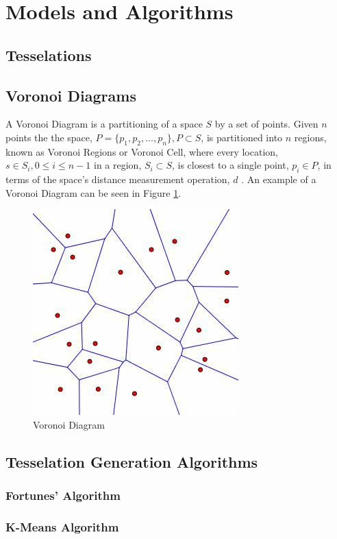\section{Models and Algorithms}\label{tes}
\subsection{Tesselations}\label{tes:sec:tess}
\subsection{Voronoi Diagrams}\label{tes:sec:vor}
A Voronoi Diagram is a partitioning of a space $S$ by a set of points. Given $n$ points the the space, $P = \{p_1,p_2,...,p_n\}, P \subset S$, is partitioned into $n$ regions, known as Voronoi Regions or Voronoi Cell, where every location, $s \in S_i,0 \leq i \leq n-1$ in a region, $S_i \subset S$, is closest to a single point, $p_i \in P$, in terms of the space's distance measurement operation, $d$ \cite{okabe2009spatial}. An example of a Voronoi Diagram can be seen in Figure \ref{tes:fig:voreg}.
\begin{figure}[H]
	\centering
    \label{tes:fig:voreg}
    \includegraphics[scale=0.65]{Images/voronoi.jpg}
    \caption{Voronoi Diagram\cite{voronoipic}}
\end{figure}
\subsection{Tesselation Generation Algorithms}\label{tes:sec:tga}
%
\subsubsection{Fortunes' Algorithm}\label{tes:ssec:fort}
%
\subsubsection{K-Means Algorithm}\label{tes:ssec:kma}
